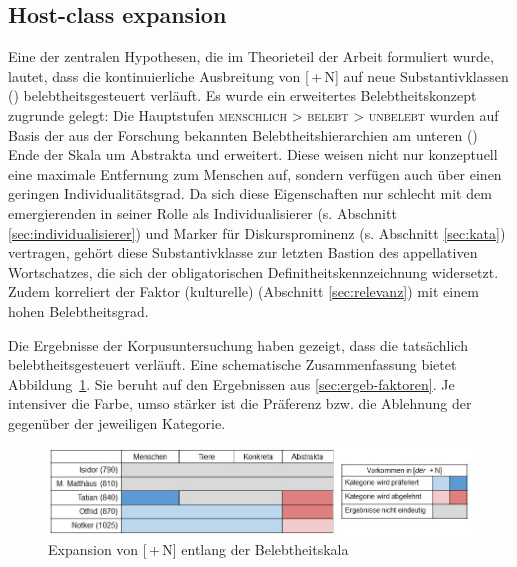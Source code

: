 \subsection{Host-class expansion}

Eine der zentralen Hypothesen, die im Theorieteil der Arbeit formuliert wurde, lautet, dass die kontinuierliche Ausbreitung von [\,+\,N] auf neue Substantivklassen ()  belebtheitsgesteuert  verläuft. Es wurde ein erweitertes Belebtheitskonzept  zugrunde gelegt: Die Hauptstufen \textsc{menschlich > belebt > unbelebt} wurden auf Basis der aus der Forschung bekannten Belebtheitshierarchien  \parencite[u.a.][]{Comrie1989,Yamamoto1999,Croft2006,Enger2011} am unteren () Ende der Skala um Abstrakta  und  erweitert. Diese weisen nicht nur konzeptuell eine maximale Entfernung zum Menschen auf, sondern verfügen auch über einen geringen  Individualitätsgrad. Da sich diese Eigenschaften nur schlecht mit dem emergierenden  in seiner Rolle als Individualisierer  (s. Abschnitt \ref{sec:individualisierer}) und Marker für Diskursprominenz (s. Abschnitt \ref{sec:kata}) vertragen, gehört diese Substantivklasse zur letzten Bastion des appellativen  Wortschatzes, die sich der obligatorischen Definitheitskennzeichnung widersetzt. Zudem korreliert der Faktor (kulturelle)  (Abschnitt \ref{sec:relevanz}) mit einem hohen  Belebtheitsgrad. 

Die Ergebnisse der Korpusuntersuchung  haben gezeigt, dass die   tatsächlich belebtheitsgesteuert  verläuft. Eine schematische Zusammenfassung bietet Abbildung~\ref{abb:expansion-belebtheit}. Sie beruht auf den Ergebnissen aus \ref{sec:ergeb-faktoren}. Je intensiver die Farbe, umso stärker ist die Präferenz bzw. die Ablehnung der gegenüber der jeweiligen Kategorie. 

\begin{figure}
  \includegraphics[width=\textwidth]{images/belebtheitsexpansion-neu.jpg}
\caption {Expansion von [\,+\,N] entlang der Belebtheitskala\label{abb:expansion-belebtheit}} 
\end{figure} 
  
